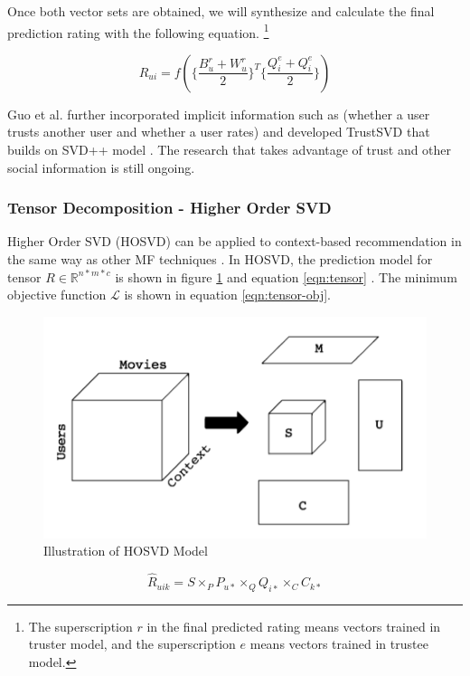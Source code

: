 \documentclass[letter paper, 11pt]{article}
\begin{document}
	Once both vector sets are obtained, we will synthesize and calculate the final prediction rating with the following equation. \footnote{The superscription $r$ in the final predicted rating means vectors trained in truster model, and the superscription $e$ means vectors trained in trustee model. }

	\begin{equation}
		\tag*{final prediction rating by TrustMF}
		R_{ui} = f(\{\dfrac{B_u^r + W_u^r}{2}\}^T \{\dfrac{Q_i^e + Q_i^e}{2}\})
	\end{equation}

	Guo et al. further incorporated implicit information such as (whether a user trusts another user and whether a user rates) and developed TrustSVD that builds on SVD++ model \cite{TrustSVD}. The research that takes advantage of trust and other social information is still ongoing.
	
	\subsubsection{Tensor Decomposition - Higher Order SVD}
	Higher Order SVD (HOSVD) can be applied to context-based recommendation in the same way as other MF techniques \cite{tensor}. In HOSVD, the prediction model for tensor $R \in \mathbb{R}^{n * m * c}$ is shown in figure \ref{fig:tensor} and equation \ref{eqn:tensor} \cite{latentFactor-RS}. The minimum objective function $\mathcal{L}$ is shown in equation \ref{eqn:tensor-obj}.
	
	\begin{figure}
		\centering
		\caption{Illustration of HOSVD Model \cite{tensor}}
		\label{fig:tensor}
		\includegraphics{tensor.png}
	\end{figure}
	
	\begin{equation}
		\label{eqn:tensor}
		\hat{R}_{uik} = S \times_P P_{u*} \times_Q Q_{i*} \times_C C_{k*}
	\end{equation}
	
\end{document}
